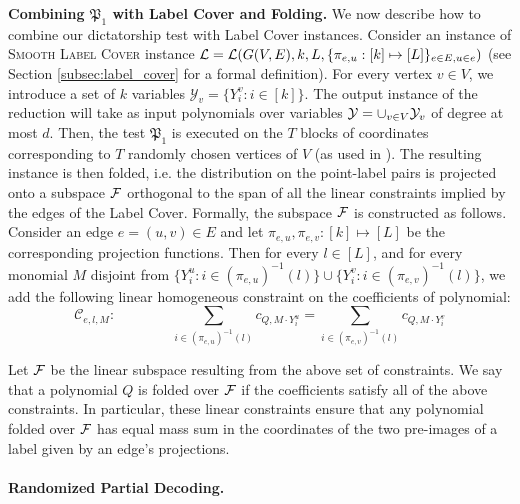 \medskip
\noindent
{\bf Combining $\mathfrak{P}_1$ with Label Cover and Folding.} We now describe how to combine our dictatorship test with Label Cover instances. Consider an instance of \textsc{Smooth Label Cover} instance $\mathcal{L} = \mathcal{L}(G(V,E),k,L,\{\pi_{e,u}:[k] \mapsto [L]\}_{e \in E,u \in e})$ (see Section \ref{subsec:label_cover} for a formal definition). For every vertex $v \in V$, we introduce a set of $k$ variables $\mathcal{Y}_v = \{Y^v_i : i \in [k]\}$. The output instance of the reduction will take as input polynomials over variables $\mathcal{Y} = \cup_{v \in V} \mathcal{Y}_v$ of degree at most $d$. Then, the test $\mathfrak{P}_1$ is executed on the $T$ blocks of coordinates corresponding to $T$ randomly chosen vertices of $V$ (as used in \cite{GRSW}). The resulting instance is then folded, i.e. 
the distribution on
the point-label pairs is projected onto a subspace $\mathcal{F}$ orthogonal to the
span of all the linear constraints implied by the edges of the Label
Cover. Formally,  the subspace $\mathcal{F}$ is constructed as follows. Consider an edge $e = (u,v) \in E$  and let $\pi_{e,u},\pi_{e,v}:[k] \mapsto [L]$ be the corresponding projection functions. Then for every $l \in [L]$, and for every monomial $M$ disjoint from $\{Y^u_i : i \in (\pi_{e,u})^{-1}(l)\} \cup \{Y^v_i : i \in (\pi_{e,v})^{-1}(l) \}$, 
we add the following linear homogeneous constraint on the coefficients of polynomial:
\begin{equation}
\mathcal{C}_{e,l,M}: \qquad\qquad \sum_{i \in (\pi_{e,u})^{-1}(l)} c_{Q,M\cdot Y^u_i} = \sum_{i \in (\pi_{e,v})^{-1}(l)} c_{Q,M\cdot Y^v_i}  
\end{equation}

Let $\mathcal{F}$ be the linear subspace resulting from the above set of constraints. We say that a polynomial $Q$ is folded over $\mathcal{F}$ if the coefficients satisfy all of the above constraints. In particular, these linear constraints ensure that any polynomial folded over $\mathcal{F}$ has
equal mass sum in the coordinates of the two pre-images of a label given by an edge's projections.  

\paragraph{Randomized Partial Decoding.}

